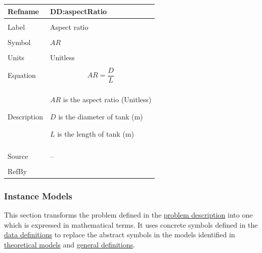 \documentclass[12pt]{article}
\begin{document}
\vspace{\baselineskip}
\noindent
\begin{minipage}{\textwidth}
\begin{tabular}{>{\raggedright}p{}>{\raggedright\arraybackslash}p{}}
\toprule \textbf{Refname} & \textbf{DD:aspectRatio}
\label{DD:aspectRatio}
\\ \midrule \\
Label & Aspect ratio
        
\\ \midrule \\
Symbol & $\mathit{AR}$
         
\\ \midrule \\
Units & Unitless
        
\\ \midrule \\
Equation & \begin{displaymath}
           \mathit{AR}=\frac{D}{L}
           \end{displaymath}
\\ \midrule \\
Description & \begin{symbDescription}
              \item{$\mathit{AR}$ is the aspect ratio (Unitless)}
              \item{$D$ is the diameter of tank (${\text{m}}$)}
              \item{$L$ is the length of tank (${\text{m}}$)}
              \end{symbDescription}
\\ \midrule \\
Source & --
         
\\ \midrule \\
RefBy & 
\\ \bottomrule
\end{tabular}
\end{minipage}

\subsubsection{Instance Models}
\label{Sec:IMs}
This section transforms the problem defined in the \hyperref[Sec:ProbDesc]{problem description} into one which is expressed in mathematical terms. It uses concrete symbols defined in the \hyperref[Sec:DDs]{data definitions} to replace the abstract symbols in the models identified in \hyperref[Sec:TMs]{theoretical models} and \hyperref[Sec:GDs]{general definitions}.
\end{document}
